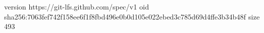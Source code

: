 version https://git-lfs.github.com/spec/v1
oid sha256:7063fef742f158ee6f1f8fbd496e0b0d105e022ebed3c785d69d4ffe3b34b48f
size 493
